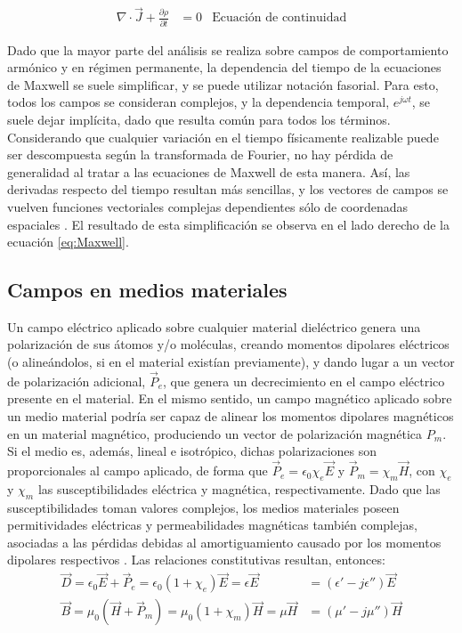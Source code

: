 \begin{align}
	\label{eq:continuidad}
	\nabla \cdot \vec{J} + \frac{\partial \rho}{\partial t} &= 0 & \text{Ecuación de continuidad}
\end{align}

Dado que la mayor parte del análisis se realiza sobre campos de comportamiento armónico y en régimen permanente, la dependencia del tiempo de la ecuaciones de Maxwell se suele simplificar, y se puede utilizar notación fasorial. Para esto, todos los campos se consideran complejos, y la dependencia temporal, $e^{j \omega t}$, se suele dejar implícita, dado que resulta común para todos los términos. Considerando que cualquier variación en el tiempo físicamente realizable puede ser descompuesta según la transformada de Fourier, no hay pérdida de generalidad al tratar a las ecuaciones de Maxwell de esta manera. Así, las derivadas respecto del tiempo resultan más sencillas, y los vectores de campos se vuelven funciones vectoriales complejas dependientes sólo de coordenadas espaciales \cite{Collin:GuidedWaves}. El resultado de esta simplificación se observa en el lado derecho de la ecuación \ref{eq:Maxwell}.

\subsection{Campos en medios materiales}
\label{subsec_campos_en_dielectricos}

Un campo eléctrico aplicado sobre cualquier material dieléctrico genera una polarización de sus átomos y/o moléculas, creando momentos dipolares eléctricos (o alineándolos, si en el material existían previamente), y dando lugar a un vector de polarización adicional, $\vec{P}_e$, que genera un decrecimiento en el campo eléctrico presente en el material. En el mismo sentido, un campo magnético aplicado sobre un medio material podría ser capaz de alinear los momentos dipolares magnéticos en un material magnético, produciendo un vector de polarización magnética $P_m$. Si el medio es, además, lineal e isotrópico, dichas polarizaciones son proporcionales al campo aplicado, de forma que $\vec{P}_e = \epsilon_0 \chi_e \vec{E}$ y $\vec{P}_m = \chi_m \vec{H}$, con $\chi_e$ y $\chi_m$ las susceptibilidades eléctrica y magnética, respectivamente. Dado que las susceptibilidades toman valores complejos, los medios materiales poseen permitividades eléctricas y permeabilidades magnéticas también complejas, asociadas a las pérdidas debidas al amortiguamiento causado por los momentos dipolares respectivos \cite{Fernandez:Electromag}. Las relaciones constitutivas resultan, entonces:
\begin{subequations}
	\label{eq:polarization_vector}
	\begin{align}
		\vec{D} = \epsilon_0 \vec{E} + \vec{P}_e = \epsilon_0 (1+\chi_e)\vec{E} = \epsilon \vec{E} &= (\epsilon' - j \epsilon'') \vec{E}\\
		\vec{B} = \mu_0 (\vec{H} + \vec{P}_m) = \mu_0 (1+\chi_m)\vec{H} = \mu \vec{H} &= (\mu' - j \mu'') \vec{H}
	\end{align}
\end{subequations}

